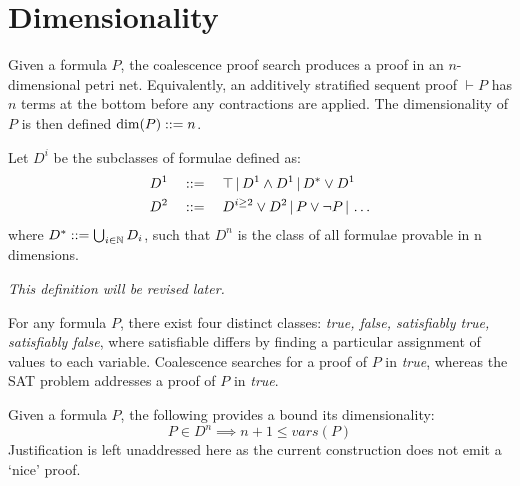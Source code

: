 \section{Dimensionality}
    
    \begin{definition*}[Dimensionality]
        Given a formula $P$, the coalescence proof search produces a proof in an $n$-dimensional petri net.
        Equivalently, an additively stratified sequent proof $\vdash P$ has $n$ terms at the bottom before any contractions are applied.
        The dimensionality of $P$ is then defined $\dim(P) ::= n$.
    \end{definition*}

    \begin{example}
    \end{example}


    \begin{definition}\label{sec-ctr:formulae-classes}
        Let $D^i$ be the subclasses of formulae defined as:
        \begin{align*}
            D^1 \quad &::= \quad \top \,|\, D^1 \wedge D^1 \,|\, D^* \vee D^1 \\
            D^2 \quad &::= \quad D^{i \geq 2} \vee D^2 \,|\, P \vee \neg P \,|\, \ldots
        \end{align*}
        where $D^* ::= \bigcup_{i \in \mathbb{N}} D_i$, such that $D^n$ is the class of all formulae provable in n dimensions.

        \textit{This definition will be revised later.}
    \end{definition}


    \begin{remark*}
        For any formula $P$, there exist four distinct classes: \textit{true, false, satisfiably true, satisfiably false}, where satisfiable differs by finding a particular assignment of values to each variable.
        Coalescence searches for a proof of $P$ in \textit{true}, whereas the SAT problem addresses a proof of $P$ in \textit{true}.
    \end{remark*}
    
    
    \begin{proposition*}
        Given a formula $P$, the following provides a bound its dimensionality:
        \begin{equation*}
            P \in D^n \implies n+1 \leq vars(P)
        \end{equation*}
        Justification is left unaddressed here as the current construction does not emit a `nice' proof.
    \end{proposition*}

